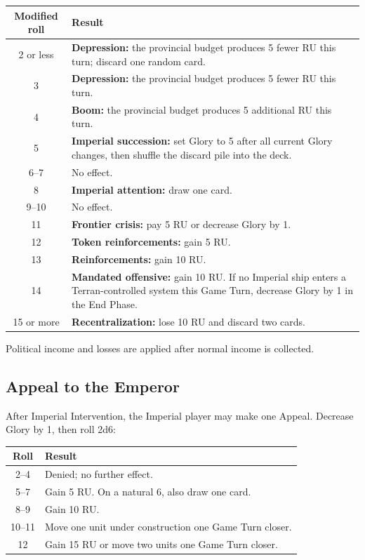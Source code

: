 \begin{tabularx}{\columnwidth}{@{}cX@{}}
\toprule
Modified roll & Result \\
\midrule
2 or less & \textbf{Depression:} the provincial budget produces 5 fewer RU
this turn; discard one random card. \\
3 & \textbf{Depression:} the provincial budget produces 5 fewer RU this turn. \\
4 & \textbf{Boom:} the provincial budget produces 5 additional RU this turn. \\
5 & \textbf{Imperial succession:} set Glory to 5 after all current Glory
changes, then shuffle the discard pile into the deck. \\
6--7 & No effect. \\
8 & \textbf{Imperial attention:} draw one card. \\
9--10 & No effect. \\
11 & \textbf{Frontier crisis:} pay 5 RU or decrease Glory by 1. \\
12 & \textbf{Token reinforcements:} gain 5 RU. \\
13 & \textbf{Reinforcements:} gain 10 RU. \\
14 & \textbf{Mandated offensive:} gain 10 RU. If no Imperial ship enters a
Terran-controlled system this Game Turn, decrease Glory by 1 in the End Phase. \\
15 or more & \textbf{Recentralization:} lose 10 RU and discard two cards. \\
\bottomrule
\end{tabularx}

Political income and losses are applied after normal income is collected.

\subsection{Appeal to the Emperor}

After Imperial Intervention, the Imperial player may make one Appeal. Decrease
Glory by 1, then roll 2d6:

\begin{tabularx}{\columnwidth}{@{}cX@{}}
\toprule
Roll & Result \\
\midrule
2--4 & Denied; no further effect. \\
5--7 & Gain 5 RU. On a natural 6, also draw one card. \\
8--9 & Gain 10 RU. \\
10--11 & Move one unit under construction one Game Turn closer. \\
12 & Gain 15 RU or move two units one Game Turn closer. \\
\bottomrule
\end{tabularx}


